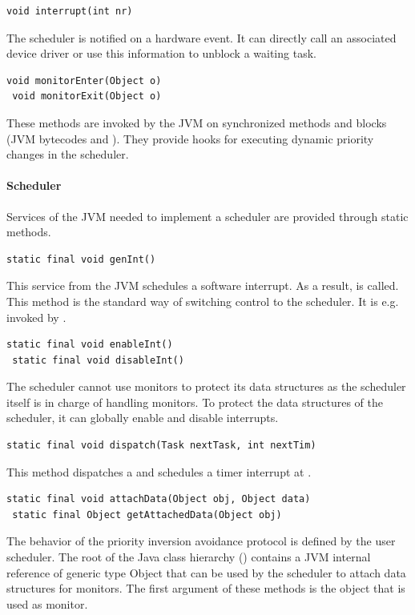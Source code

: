\begin{lstlisting}[emph=interrupt]
void interrupt(int nr)
\end{lstlisting}
The scheduler is notified on a hardware event. It can directly call
an associated device driver or use this information to unblock a
waiting task.

\begin{lstlisting}[emph={monitorEnter,monitorExit}]
 void monitorEnter(Object o)
 void monitorExit(Object o)
\end{lstlisting}
These methods are invoked by the JVM on synchronized methods and
blocks (JVM bytecodes  and ).
They provide hooks for executing dynamic priority changes in the
scheduler.

\paragraph{Scheduler}

Services of the JVM needed to implement a scheduler are provided
through static methods.

\begin{lstlisting}[emph=genInt]
static final void genInt()
\end{lstlisting}
This service from the JVM schedules a software interrupt. As a
result,  is called. This method is the standard way
of switching control to the scheduler. It is e.g. invoked by
.

\begin{lstlisting}[emph={enableInt,disableInt}]
 static final void enableInt()
 static final void disableInt()
\end{lstlisting}
The scheduler cannot use monitors to protect its data structures as
the scheduler itself is in charge of handling monitors. To protect
the data structures of the scheduler, it can globally enable and
disable interrupts.

\begin{lstlisting}[emph=dispatch]
static final void dispatch(Task nextTask, int nextTim)
\end{lstlisting}
This method dispatches a  and schedules a timer interrupt
at .

\begin{lstlisting}[emph={attachData,getAttachedData}]
 static final void attachData(Object obj, Object data)
 static final Object getAttachedData(Object obj)
\end{lstlisting}
The behavior of the priority inversion avoidance protocol is defined
by the user scheduler. The root of the Java class hierarchy
() contains a JVM internal reference of
generic type Object that can be used by the scheduler to attach data
structures for monitors. The first argument of these methods is the
object that is used as monitor.

